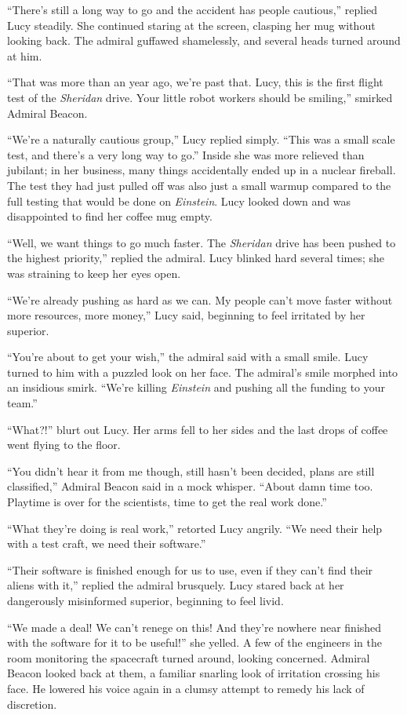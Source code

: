 \documentclass[openany, 12pt]{book} %
\begin{document}
``There's still a long way to go and the accident has people cautious,'' replied Lucy steadily. She continued staring at the screen, clasping her mug without looking back. The admiral guffawed shamelessly, and several heads turned around at him.

``That was more than an year ago, we're past that. Lucy, this is the first flight test of the \textit{Sheridan} drive. Your little robot workers should be smiling,'' smirked Admiral Beacon.

``We're a naturally cautious group,'' Lucy replied simply. ``This was a small scale test, and there's a very long way to go.'' Inside she was more relieved than jubilant; in her business, many things accidentally ended up in a nuclear fireball. The test they had just pulled off was also just a small warmup compared to the full testing that would be done on \textit{Einstein}. Lucy looked down and was disappointed to find her coffee mug empty.

``Well, we want things to go much faster. The \textit{Sheridan} drive has been pushed to the highest priority,'' replied the admiral. Lucy blinked hard several times; she was straining to keep her eyes open.

``We're already pushing as hard as we can. My people can't move faster without more resources, more money,'' Lucy said, beginning to feel irritated by her superior.

``You're about to get your wish,'' the admiral said with a small smile. Lucy turned to him with a puzzled look on her face. The admiral's smile morphed into an insidious smirk. ``We're killing \textit{Einstein} and pushing all the funding to your team.''

``What?!'' blurt out Lucy. Her arms fell to her sides and the last drops of coffee went flying to the floor.

``You didn't hear it from me though, still hasn't been decided, plans are still classified,'' Admiral Beacon said in a mock whisper. ``About damn time too. Playtime is over for the scientists, time to get the real work done.''

``What they're doing is real work,'' retorted Lucy angrily. ``We need their help with a test craft, we need their software.''

``Their software is finished enough for us to use, even if they can't find their aliens with it,'' replied the admiral brusquely. Lucy stared back at her dangerously misinformed superior, beginning to feel livid.

``We made a deal! We can't renege on this! And they're nowhere near finished with the software for it to be useful!'' she yelled. A few of the engineers in the room monitoring the spacecraft turned around, looking concerned. Admiral Beacon looked back at them, a familiar snarling look of irritation crossing his face. He lowered his voice again in a clumsy attempt to remedy his lack of discretion.
\end{document}
